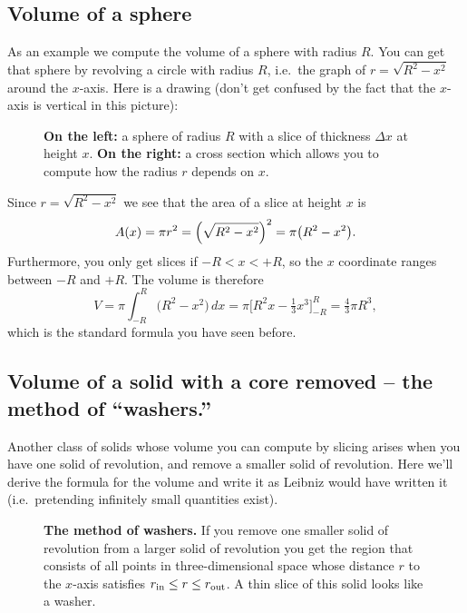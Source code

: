 \subsection{Volume of a sphere}
\label{sec:volume-sphere}
As an example we compute the volume of a sphere with radius $R$.  You can get
that sphere by revolving a circle with radius $R$, i.e.~the graph of
$r=\sqrt{R^2-x^2}$ around the $x$-axis.  Here is a drawing (don't get confused
by the fact that the $x$-axis is vertical in this picture):

\begin{figure}[h]\centering
  
  \caption{\textbf{On the left:} a sphere of radius $R$ with a slice of
    thickness $\Delta x$ at height $x$. \textbf{On the right:} a cross section
    which allows you to compute how the radius $r$ depends on $x$.}
\end{figure}
Since $r=\sqrt{R^2-x^2}$ we see that the area of a slice at height $x$ is
\[
A(x) = \pi r^2 =\Bigl(\sqrt{R^2-x^2}\Bigr)^2 = \pi \bigl(R^2-x^2\bigr).
\]
Furthermore, you only get slices if $-R < x <+R$, so the $x$ coordinate ranges
between $-R$ and $+R$.  The volume is therefore
\[
V = \pi \int_{-R}^R \bigl(R^2-x^2\bigr) \,dx =\pi \bigl[R^2x - \tfrac13
x^3\bigr]_{-R}^R =\tfrac{4} {3}\pi R^3,
\]
which is the standard formula you have seen before.



\subsection{Volume of a solid with a core removed -- the method of ``washers.''}
\label{sec:volume-solid-with-core-removed}
Another class of solids whose volume you can compute by slicing arises when you
have one solid of revolution, and remove a smaller solid of revolution.  Here
we'll derive the formula for the volume and write it as Leibniz would have
written it (i.e.~pretending infinitely small quantities exist).

\begin{figure}[ht]\centering
  \parbox{175pt}{ }
  \parbox{175pt}{\footnotesize }
  \caption{\textbf{The method of washers.}  If you remove one smaller solid of
    revolution from a larger solid of revolution you get the region that
    consists of all points in three-dimensional space whose distance $r$ to the
    $x$-axis satisfies $r_{\rm in} \leq r\leq r_{\rm out}$.  A thin slice of
    this solid looks like a washer.  }
  \label{fig:09surf_of_rotation}
\end{figure}

